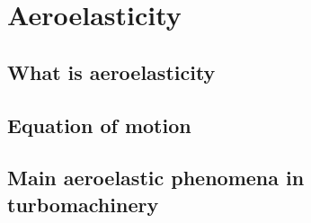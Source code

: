 \chapter{Aeroelasticity}
\label{cha:ael}

\chabstract{}

\minitoc
\newpage

\section{What is aeroelasticity}
\label{sec:what_is_ael}


\section{Equation of motion}
\label{sec:equation_of_motion}


\section{Main aeroelastic phenomena in turbomachinery}
\label{sec:ael_phenomena}


\chconclu{}
